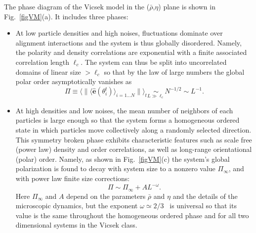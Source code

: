The phase diagram of the Vicsek model in the ($\bar{\rho}$,$\eta$) plane is shown in Fig.~\ref{figVM}(a). It includes three phases:
\begin{itemize}
\item At low particle densities and high noises, fluctuations dominate over alignment interactions and the system is thus globally disordered. 
Namely, the polarity and density correlations are exponential with a finite associated correlation length $\ell_c$. 
The system can thus be split into uncorrelated domains of linear size $> \ell_c$ so that by the law of large numbers the global polar order asymptotically vanishes as
\begin{equation}
\Pi \equiv \langle \|\langle \hat{\bm e}(\theta_i^{t}) \rangle_{i=1\ldots N}\|\rangle_t \underset{L \gg \ell_c}{\sim} N^{-1/2} \sim L^{-1} .
\end{equation} 
\item At high densities and low noises, the mean number of neighbors of each particles is large enough so that the system forms 
a homogeneous ordered state in which particles move collectively along a randomly selected direction. 
This symmetry broken phase exhibits characteristic features such as scale free (power law) density and order correlations, 
as well as long-range orientational (polar) order.
Namely, as shown in Fig.~\ref{figVM}(c) the system's global polarization is found to decay with system size to a nonzero value $\Pi_\infty$, and with power law finite size corrections:
\begin{equation}
\label{eq_LRO}
\Pi \sim \Pi_{\infty} + A L^{-\omega} .
\end{equation} 
Here $\Pi_\infty$ and $A$ depend on the parameters $\bar{\rho}$ and $\eta$ and the details of the microscopic dynamics, 
but the exponent $\omega \simeq 2/3$~\cite{chate2020dry} is universal so that its value is the same throughout the homogeneous ordered phase and for all two dimensional systems in the Vicsek class.


\end{itemize}
